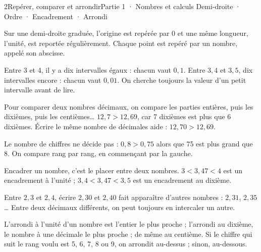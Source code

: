 \begin{ouverture}[calcul]{2}{Repérer, comparer et arrondir}{Partie 1 · Nombres et calculs}
{Demi-droite · Ordre · Encadrement · Arrondi}
\end{ouverture}
\pagestyle{otMain}\essentiel\fontsize{11}{15}\selectfont
{}\label{cours-2-1}
\begin{definition}Sur une demi-droite graduée, l’origine est repérée par 0 et une même longueur, l’unité, est reportée régulièrement. Chaque point est repéré par un nombre, appelé son abscisse.\end{definition}
\label{fig-cours-2-1-cours-droite-zoom}

\begin{savoirfaire}Entre 3 et 4, il y a dix intervalles égaux : chacun vaut $0{,}1$. Entre $3{,}4$ et $3{,}5$, dix intervalles encore : chacun vaut $0{,}01$. On cherche toujours la valeur d’un petit intervalle avant de lire.\end{savoirfaire}
\begin{propriete}Pour comparer deux nombres décimaux, on compare les parties entières, puis les dixièmes, puis les centièmes… $12{,}7>12{,}69$, car 7 dixièmes est plus que 6 dixièmes. Écrire le même nombre de décimales aide : $12{,}70>12{,}69$.\end{propriete}
\begin{attention}Le nombre de chiffres ne décide pas : $0{,}8>0{,}75$ alors que 75 est plus grand que 8. On compare rang par rang, en commençant par la gauche.\end{attention}
\clearpage
{}\label{cours-2-2}
\begin{definition}Encadrer un nombre, c’est le placer entre deux nombres. $3<3{,}47<4$ est un encadrement à l’unité ; $3{,}4<3{,}47<3{,}5$ est un encadrement au dixième.\end{definition}
\begin{savoirfaire}[Intercaler]Entre $2{,}3$ et $2{,}4$, écrire $2{,}30$ et $2{,}40$ fait apparaître d’autres nombres : $2{,}31$, $2{,}35$… Entre deux décimaux différents, on peut toujours en intercaler un autre.\end{savoirfaire}
\begin{definition}L’arrondi à l’unité d’un nombre est l’entier le plus proche ; l’arrondi au dixième, le nombre à une décimale le plus proche ; de même au centième. Si le chiffre qui suit le rang voulu est 5, 6, 7, 8 ou 9, on arrondit au-dessus ; sinon, au-dessous.\end{definition}
\label{fig-cours-2-2-cours-arrondi}

